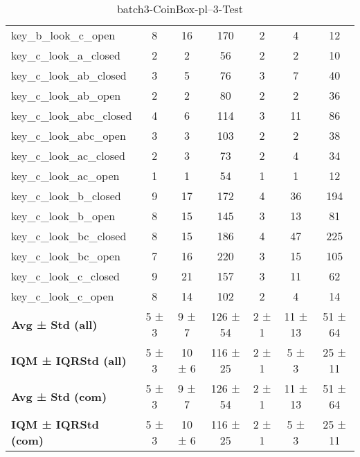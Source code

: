 \begin{table}[!ht]
\begin{tabular}{l|ccc|ccc}
key\_b\_look\_c\_open & 8 & 16 & 170 & 2 & 4 & 12 \\
key\_c\_look\_a\_closed & 2 & 2 & 56 & 2 & 2 & 10 \\
key\_c\_look\_ab\_closed & 3 & 5 & 76 & 3 & 7 & 40 \\
key\_c\_look\_ab\_open & 2 & 2 & 80 & 2 & 2 & 36 \\
key\_c\_look\_abc\_closed & 4 & 6 & 114 & 3 & 11 & 86 \\
key\_c\_look\_abc\_open & 3 & 3 & 103 & 2 & 2 & 38 \\
key\_c\_look\_ac\_closed & 2 & 3 & 73 & 2 & 4 & 34 \\
key\_c\_look\_ac\_open & 1 & 1 & 54 & 1 & 1 & 12 \\
key\_c\_look\_b\_closed & 9 & 17 & 172 & 4 & 36 & 194 \\
key\_c\_look\_b\_open & 8 & 15 & 145 & 3 & 13 & 81 \\
key\_c\_look\_bc\_closed & 8 & 15 & 186 & 4 & 47 & 225 \\
key\_c\_look\_bc\_open & 7 & 16 & 220 & 3 & 15 & 105 \\
key\_c\_look\_c\_closed & 9 & 21 & 157 & 3 & 11 & 62 \\
key\_c\_look\_c\_open & 8 & 14 & 102 & 2 & 4 & 14 \\
\hline
\textbf{Avg ± Std (all)} & 5 ± 3 & 9 ± 7 & 126 ± 54 & 2 ± 1 & 11 ± 13 & 51 ± 64 \\
\textbf{IQM ± IQRStd (all)} & 5 ± 3 & 10 ± 6 & 116 ± 25 & 2 ± 1 & 5 ± 3 & 25 ± 11 \\
\textbf{Avg ± Std (com)} & 5 ± 3 & 9 ± 7 & 126 ± 54 & 2 ± 1 & 11 ± 13 & 51 ± 64 \\
\textbf{IQM ± IQRStd (com)} & 5 ± 3 & 10 ± 6 & 116 ± 25 & 2 ± 1 & 5 ± 3 & 25 ± 11 \\
\end{tabular}
\caption{batch3-CoinBox-pl--3-Test}
\label{tab:batch3_CoinBox_pl__3_comparison_test}
\end{table}

